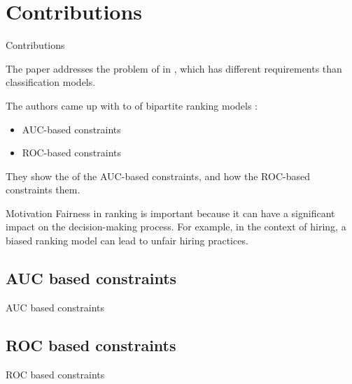 \section{Contributions}
\begin{frame}{Contributions}

    The paper addresses the problem of  in , which has different requirements than classification models.
    
    The authors came up with  to  of bipartite ranking models :
  \begin{itemize}
      \item AUC-based constraints
      \item ROC-based constraints
  \end{itemize}
  
  They show the  of the AUC-based constraints, and how the ROC-based constraints  them.
\end{frame}

\begin{frame}{Motivation}
    Fairness in ranking is important because it can have a significant impact on the decision-making process. For example, in the context of hiring, a biased ranking model can lead to unfair hiring practices.
\end{frame}


\subsection{AUC based constraints}
\begin{frame}{AUC based constraints}

\end{frame}

\subsection{ROC based constraints}
\begin{frame}{ROC based constraints}
\end{frame}
